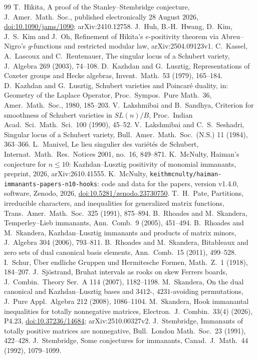 \documentclass[11pt]{amsart}
\theoremstyle{definition}
\theoremstyle{remark}
\begin{document}
\begin{thebibliography}{99}
 T.~Hikita, A proof of the Stanley--Stembridge conjecture, J.\ Amer.\ Math.\ Soc., published electronically 28 August 2026, \href{https://doi.org/10.1090/jams/1090}{doi:10.1090/jams/1090}; arXiv:2410.12758.
 J.~Huh, B.-H.~Hwang, D.~Kim, J.~S.~Kim and J.~Oh, Refinement of Hikita's $e$-positivity theorem via Abreu--Nigro's $g$-functions and restricted modular law, arXiv:2504.09123v1.
 C.~Kassel, A.~Lascoux and C.~Reutenauer, The singular locus of a Schubert variety, J.\ Algebra 269 (2003), 74--108.
 D.~Kazhdan and G.~Lusztig, Representations of Coxeter groups and Hecke algebras, Invent.\ Math.\ 53 (1979), 165--184.
 D.~Kazhdan and G.~Lusztig, Schubert varieties and Poincar\'e duality, in: Geometry of the Laplace Operator, Proc.\ Sympos.\ Pure Math.\ 36, Amer.\ Math.\ Soc., 1980, 185--203.
 V.~Lakshmibai and B.~Sandhya, Criterion for smoothness of Schubert varieties in $SL(n)/B$, Proc.\ Indian Acad.\ Sci.\ Math.\ Sci.\ 100 (1990), 45--52.
 V.~Lakshmibai and C.~S.~Seshadri, Singular locus of a Schubert variety, Bull.\ Amer.\ Math.\ Soc.\ (N.S.) 11 (1984), 363--366.
 L.~Manivel, Le lieu singulier des vari\'et\'es de Schubert, Internat.\ Math.\ Res.\ Notices 2001, no.\ 16, 849--871.
 K.~McNulty, Haiman's conjecture for $n\le10$: Kazhdan--Lusztig positivity of monomial immanants, preprint, 2026, arXiv:2610.41555.
 K.~McNulty, \texttt{keithmcnulty/haiman-immanants-papers-n10-hooks}: code and data for the papers, version v1.4.0, software, Zenodo, 2026, \href{https://doi.org/10.5281/zenodo.23730750}{doi:10.5281/zenodo.23730750}.
 T.~H.~Pate, Partitions, irreducible characters, and inequalities for generalized matrix functions, Trans.\ Amer.\ Math.\ Soc.\ 325 (1991), 875--894.
 B.~Rhoades and M.~Skandera, Temperley--Lieb immanants, Ann.\ Comb.\ 9 (2005), 451--494.
 B.~Rhoades and M.~Skandera, Kazhdan--Lusztig immanants and products of matrix minors, J.\ Algebra 304 (2006), 793--811.
 B.~Rhoades and M.~Skandera, Bitableaux and zero sets of dual canonical basis elements, Ann.\ Comb.\ 15 (2011), 499--528.
 I.~Schur, \"Uber endliche Gruppen und Hermitesche Formen, Math.\ Z.\ 1 (1918), 184--207.
 J.~Sj\"ostrand, Bruhat intervals as rooks on skew Ferrers boards, J.\ Combin.\ Theory Ser.\ A 114 (2007), 1182--1198.
 M.~Skandera, On the dual canonical and Kazhdan--Lusztig bases and $3412$-, $4231$-avoiding permutations, J.\ Pure Appl.\ Algebra 212 (2008), 1086--1104.
 M.~Skandera, Hook immanantal inequalities for totally nonnegative matrices, Electron.\ J.\ Combin.\ 33(4) (2026), P4.23, \href{https://doi.org/10.37236/14684}{doi:10.37236/14684}; arXiv:2510.00327v2.
 J.~Stembridge, Immanants of totally positive matrices are nonnegative, Bull.\ London Math.\ Soc.\ 23 (1991), 422--428.
 J.~Stembridge, Some conjectures for immanants, Canad.\ J.\ Math.\ 44 (1992), 1079--1099.
\end{thebibliography}
\end{document}

